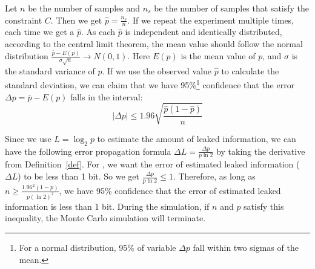 Let $n$ be the number of samples and $n_s$ be the number of samples that satisfy
the constraint $C$. Then we get $\hat{p} = \frac{n_s}{n}$. If we repeat the
experiment multiple times, each time we get a $\hat{p}$. As each
$\hat{p}$ is independent and identically distributed, according to the central limit
theorem, the mean value should follow the normal distribution
$ \frac{\bar{p}-E(p)}{\sigma\sqrt{n}} \rightarrow N(0,1) $. Here $E(p)$ is the
mean value of $p$, and $\sigma$ is the standard variance of $p$. If we use the
observed value $\hat{p}$ to calculate the standard deviation, we can claim that
we have 95\%\footnote{For a normal distribution, 95\% of variable $\Delta p$ fall within two sigmas of the mean.} 
confidence that the error $\Delta p= \bar{p} - E(p)$ falls in the interval:
$$ |\Delta p| \leq 1.96\sqrt{\frac{ \hat{p} (1- \hat{p} )}{n}}$$

Since we use $L = \log_{2}p$ to estimate the amount of leaked information, we
can have the following error propagation formula $\Delta L = \frac{\Delta
p}{p\ln2}$ by taking the derivative from Definition~\ref{def}. For \tool, we want the error of estimated leaked
information ($\Delta L$) to be less than 1 bit. So we get $\frac{\Delta
p}{p\ln2} \leq 1$. Therefore, as long as $ n \geq \frac{1.96^2(1-p)}{p(\ln2)^2}$, we have
95\% confidence that the error of estimated leaked information is less than 1 bit.
During the simulation, if $n$ and $p$ satisfy this inequality, the Monte Carlo
simulation will terminate.
